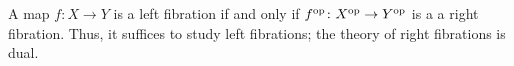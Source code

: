 \documentclass[main.tex]{subfiles}
\begin{document}
\begin{note}
  A map $f\colon X \to Y$ is a left fibration if and only if $f^{\mathrm{op}}\colon X^{\mathrm{op}} \to Y^{\mathrm{op}}$ is a a right fibration. Thus, it suffices to study left fibrations; the theory of right fibrations is dual.
\end{note}

%
%
\end{document}
